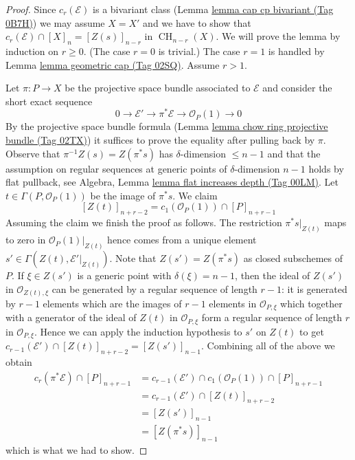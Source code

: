 \documentclass{amsart}
\theoremstyle{plain}
\theoremstyle{definition}
\theoremstyle{remark}
\numberwithin{equation}{subsection}
\def\CH{\mathop{\mathrm{CH}}\nolimits}
\begin{document}
\begin{proof}
Since $c_r(\mathcal{E})$ is a bivariant class
(Lemma \href{https://stacks.math.columbia.edu/tag/0B7H}{lemma cap cp bivariant (Tag 0B7H)})
we may assume $X = X'$ and we have to show that
$c_r(\mathcal{E}) \cap [X]_n = [Z(s)]_{n - r}$ in $\CH_{n - r}(X)$.
We will prove the lemma by induction on $r \geq 0$. (The case
$r = 0$ is trivial.) The case $r = 1$
is handled by Lemma \href{https://stacks.math.columbia.edu/tag/02SQ}{lemma geometric cap (Tag 02SQ)}. Assume $r > 1$.

\medskip\noindent
Let $\pi : P \to X$ be the projective space bundle associated to
$\mathcal{E}$ and consider the short exact sequence
$$
0 \to \mathcal{E}' \to \pi^*\mathcal{E} \to \mathcal{O}_P(1) \to 0
$$
By the projective space bundle formula
(Lemma \href{https://stacks.math.columbia.edu/tag/02TX}{lemma chow ring projective bundle (Tag 02TX)})
it suffices to prove the equality after pulling back by $\pi$.
Observe that $\pi^{-1}Z(s) = Z(\pi^*s)$ has $\delta$-dimension
$\leq n - 1$ and that the assumption on regular sequences at
generic points of $\delta$-dimension $n - 1$ holds by
flat pullback, see
Algebra, Lemma \href{https://stacks.math.columbia.edu/tag/00LM}{lemma flat increases depth (Tag 00LM)}.
Let $t \in \Gamma(P, \mathcal{O}_P(1))$ be the image of $\pi^*s$.
We claim
$$
[Z(t)]_{n + r - 2} = c_1(\mathcal{O}_P(1)) \cap [P]_{n + r - 1}
$$
Assuming the claim we finish the proof as follows.
The restriction $\pi^*s|_{Z(t)}$ maps to zero in
$\mathcal{O}_P(1)|_{Z(t)}$ hence comes from a unique
element $s' \in \Gamma(Z(t), \mathcal{E}'|_{Z(t)})$.
Note that $Z(s') = Z(\pi^*s)$ as closed subschemes of $P$.
If $\xi \in Z(s')$ is a generic point with $\delta(\xi) = n - 1$,
then the ideal of $Z(s')$ in $\mathcal{O}_{Z(t), \xi}$
can be generated by a regular sequence of length $r - 1$: it is generated by
$r - 1$ elements which are the images of $r - 1$ elements in
$\mathcal{O}_{P, \xi}$ which together with a generator of the
ideal of $Z(t)$ in $\mathcal{O}_{P, \xi}$ form a regular sequence
of length $r$ in $\mathcal{O}_{P, \xi}$. Hence we can apply the
induction hypothesis to $s'$ on $Z(t)$ to get
$c_{r - 1}(\mathcal{E}') \cap [Z(t)]_{n + r - 2} = [Z(s')]_{n - 1}$.
Combining all of the above we obtain
\begin{align*}
c_r(\pi^*\mathcal{E}) \cap [P]_{n + r - 1}
& =
c_{r - 1}(\mathcal{E}') \cap c_1(\mathcal{O}_P(1)) \cap [P]_{n + r - 1} \\
& =
c_{r - 1}(\mathcal{E}') \cap [Z(t)]_{n + r - 2} \\
& =
[Z(s')]_{n - 1} \\
& = [Z(\pi^*s)]_{n - 1}
\end{align*}
which is what we had to show.


\end{proof}
\end{document}
